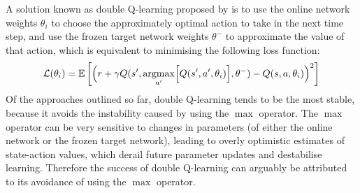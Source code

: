 A solution known as double Q-learning proposed by \cite{van2016deep} is to use the online network weights $\theta_i$ to choose the approximately optimal action to take in the next time step, and use the frozen target network weights $\theta^-$ to approximate the value of that action, which is equivalent to minimising the following loss function:
\begin{equation*}
    \mathcal{L}(\theta_i) = \mathbb{E}\left[ \Bigl(r + \gamma Q(s', \underset{a'}{\operatorname{argmax}}\Bigl[Q(s', a', \theta_i)\Bigr], \theta^-) - Q(s, a, \theta_i)\Bigr)^2 \right]
\end{equation*}
Of the approaches outlined so far, double Q-learning tends to be the most stable, because it avoids the instability caused by using the $\max$ operator. The $\max$ operator can be very sensitive to changes in parameters (of either the online network or the frozen target network), leading to overly optimistic estimates of state-action values, which derail future parameter updates and destabilise learning. Therefore the success of double Q-learning can arguably be attributed to its avoidance of using the $\max$ operator.
